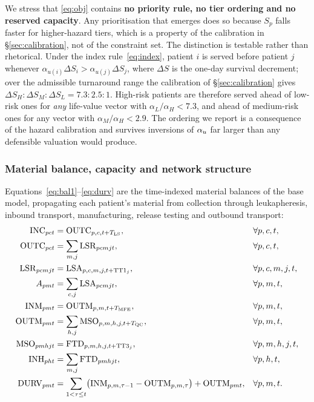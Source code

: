 We stress that \eqref{eq:obj} contains \textbf{no priority rule, no tier
ordering and no reserved capacity}. Any prioritisation that emerges does so
because $S_p$ falls faster for higher-hazard tiers, which is a property of the
calibration in \S\ref{sec:calibration}, not of the constraint set. The
distinction is testable rather than rhetorical. Under the index
rule~\eqref{eq:index}, patient $i$ is served before patient $j$ whenever
$\alpha_{u(i)} \Delta S_i > \alpha_{u(j)} \Delta S_j$, where $\Delta S$ is the
one-day survival decrement; over the admissible turnaround range the
calibration of \S\ref{sec:calibration} gives $\Delta S_H : \Delta S_M : \Delta
S_L = 7.3 : 2.5 : 1$. High-risk patients are therefore served ahead of low-risk
ones for \emph{any} life-value vector with $\alpha_L / \alpha_H < 7.3$, and
ahead of medium-risk ones for any vector with $\alpha_M / \alpha_H < 2.9$. The
ordering we report is a consequence of the hazard calibration and survives
inversions of $\alpha_{u}$ far larger than any defensible valuation would
produce.

\subsubsection{Material balance, capacity and network structure}

Equations~\eqref{eq:bal1}--\eqref{eq:durv} are the time-indexed material
balances of the base model, propagating each patient's material from collection
through leukapheresis, inbound transport, manufacturing, release testing and
outbound transport:
\begin{align}
  \mathrm{INC}_{pct} &= \mathrm{OUTC}_{p,c,t+T_{\mathrm{LS}}}, & &\forall p,c,t, \label{eq:bal1}\\
  \mathrm{OUTC}_{pct} &= \sum_{m,j} \mathrm{LSR}_{pcmjt}, & &\forall p,c,t, \label{eq:bal2}\\
  \mathrm{LSR}_{pcmjt} &= \mathrm{LSA}_{p,c,m,j,t+\mathrm{TT1}_j}, & &\forall p,c,m,j,t, \label{eq:bal3}\\
  A_{pmt} &= \sum_{c,j} \mathrm{LSA}_{pcmjt}, & &\forall p,m,t, \label{eq:arrival}\\
  \mathrm{INM}_{pmt} &= \mathrm{OUTM}_{p,m,t+T_{\mathrm{MFE}}}, & &\forall p,m,t, \label{eq:bal5}\\
  \mathrm{OUTM}_{pmt} &= \sum_{h,j} \mathrm{MSO}_{p,m,h,j,t+T_{\mathrm{QC}}}, & &\forall p,m,t, \label{eq:bal6}\\
  \mathrm{MSO}_{pmhjt} &= \mathrm{FTD}_{p,m,h,j,t+\mathrm{TT3}_j}, & &\forall p,m,h,j,t, \label{eq:bal7}\\
  \mathrm{INH}_{pht} &= \sum_{m,j} \mathrm{FTD}_{pmhjt}, & &\forall p,h,t, \label{eq:bal8}\\
  \mathrm{DURV}_{pmt} &= \sum_{1<\tau\le t}\bigl(\mathrm{INM}_{p,m,\tau-1} - \mathrm{OUTM}_{p,m,\tau}\bigr)
                 + \mathrm{OUTM}_{pmt}, & &\forall p,m,t. \label{eq:durv}
\end{align}

